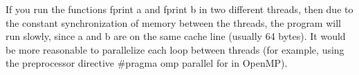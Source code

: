 {	\begin{figure}[H]
		
	\end{figure}
	\par If you run the functions fprint \textunderscore a and fprint \textunderscore b in two different threads, then due to the constant synchronization of memory between the threads, the program will run slowly, since a and b are on the same cache line (usually 64 bytes). It would be more reasonable to parallelize each loop between threads (for example, using the preprocessor directive  \#pragma omp parallel for in OpenMP).
}